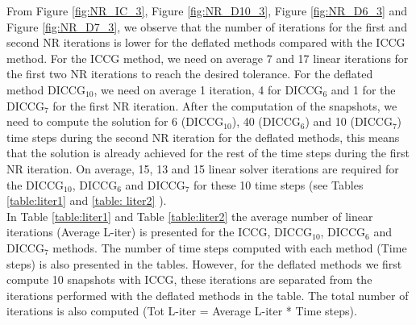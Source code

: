 \documentclass[12pt]{article}
\numberwithin{equation}{section}
\begin{document}
From Figure \ref{fig:NR_IC_3}, Figure \ref{fig:NR_D10_3}, Figure \ref{fig:NR_D6_3} and Figure \ref{fig:NR_D7_3}, we observe that the number of iterations for the first and second NR iterations is lower for the deflated methods compared with the ICCG method. For the ICCG method, we need on average 7 and 17 linear iterations for the first two NR iterations to reach the desired tolerance. For the deflated method DICCG$_{10}$, we need on average 1 iteration, 4 for DICCG$_6$ and 1 for the DICCG$_7$ for the first NR iteration. After the computation of the snapshots, we need to compute the solution for 6 (DICCG$_{10}$), 40 (DICCG$_{6}$) and 10 (DICCG$_{7}$) time steps during the second NR iteration for the deflated methods, this means that the solution is already achieved for the rest of the time steps during the first NR iteration. On average, 15, 13 and 15 linear solver iterations are required for the DICCG$_{10}$, DICCG$_6$ and DICCG$_7$ for these 10 time steps (see Tables \ref{table:liter1} and \ref{table:
liter2} ). \\
In Table \ref{table:liter1} and Table \ref{table:liter2} the average number of linear iterations (Average L-iter) is presented for the ICCG, DICCG$_{10}$, DICCG$_6$ and DICCG$_7$ methods. The number of time steps computed with each method (Time steps) is also presented in the tables. However, for the deflated methods we first compute 10 snapshots with ICCG, these iterations are separated from the iterations performed with the deflated methods in the table. The total number of iterations is also computed (Tot L-iter = Average L-iter * Time steps). 
\end{document}
